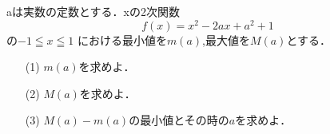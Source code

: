 \documentclass[8pt,dvipdfmx]{article}
\begin{document}
\begin{tcolorbox}[title=数学\textcircled{1} 1-6 BC]
aは実数の定数とする．xの2次関数
\[
f(x) = x^2 - 2ax + a^2 +1
\]
の\(-1 \leqq x \leqq 1\) における最小値を\(m(a)\),最大値を\(M(a)\)とする．
\begin{enumerate}
    \item[(1)] \(m(a)\)を求めよ．
    \vspace{2mm} %
    \item[(2)] \(M(a)\)を求めよ．
    \vspace{2mm} %
    \item[(3)] \(M(a)-m(a)\)の最小値とその時の\(a\)を求めよ．
\end{enumerate}
\end{tcolorbox}

\end{document}
